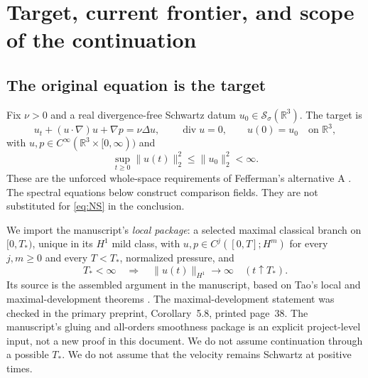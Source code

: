 \documentclass[11pt,a4paper]{article}
\theoremstyle{definition}\newtheorem{definition}[theorem]{Definition}
\theoremstyle{remark}\newtheorem{remark}[theorem]{Remark}
\newcommand{\R}{\mathbb R}
\newcommand{\norm}[1]{\lVert #1\rVert}
\newcommand{\diver}{\operatorname{div}}
\newcommand{\Sch}{\mathcal S_\sigma(\R^3)}
\numberwithin{equation}{section}
\begin{document}
\section{Target, current frontier, and scope of the continuation}
\label{sec:scope}
\subsection{The original equation is the target}
Fix $\nu>0$ and a real divergence-free Schwartz datum $u_0\in\Sch$. The target is
\begin{equation}\label{eq:NS}
 u_t+(u\cdot\nabla)u+\nabla p=\nu\Delta u,
 \qquad\diver u=0,\qquad u(0)=u_0\quad\text{on }\R^3,
\end{equation}
with $u,p\in C^\infty(\R^3\times[0,\infty))$ and
\begin{equation}\label{eq:targetenergy}
 \sup_{t\ge0}\norm{u(t)}_2^2\le\norm{u_0}_2^2<\infty.
\end{equation}
These are the unforced whole-space requirements of Fefferman's alternative A \cite{Clay}. The spectral equations below construct comparison fields. They are not substituted for \eqref{eq:NS} in the conclusion.

We import the manuscript's \emph{local package}: a selected maximal classical branch on $[0,T_*)$, unique in its $H^1$ mild class, with $u,p\in C^j([0,T];H^m)$ for every $j,m\ge0$ and every $T<T_*$, normalized pressure, and
\begin{equation}\label{eq:localalternative}
 T_*<\infty\quad\Longrightarrow\quad
 \norm{u(t)}_{H^1}\longrightarrow\infty\quad(t\uparrow T_*).
\end{equation}
Its source is the assembled argument in the manuscript, based on Tao's local and maximal-development theorems \cite{Paper,Tao}. The maximal-development statement was checked in the primary preprint, Corollary~5.8, printed page~38. The manuscript's gluing and all-orders smoothness package is an explicit project-level input, not a new proof in this document. We do not assume continuation through a possible $T_*$. We do not assume that the velocity remains Schwartz at positive times.
\end{document}
